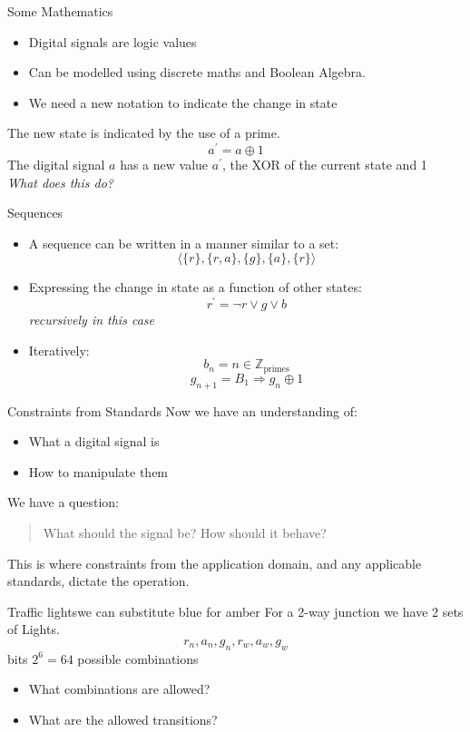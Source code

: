 \documentclass[xcolor=svgnames]{beamer}
\begin{document}
\begin{frame}{Some Mathematics}
\begin{itemize}
  \item Digital signals are logic values
  \item Can be modelled using discrete maths and Boolean Algebra.
  \item We need a new notation to indicate the change in state
\end{itemize}

\begin{definition}
  The new state is indicated by the use of a prime.
  \[
    a^\prime = a \oplus 1
  \]
The digital signal $a$ has a new value $a^\prime$,  the XOR of the current state and 1
\\[1em]
\hfill \textit{What does this do?}
\end{definition}
\end{frame}

\begin{frame}{Sequences}
  \begin{itemize}[<+->]
    \item A sequence can be written in a manner similar to a set:
    \[ \langle \{r\}, \{r,a\}, \{g\}, \{a\}, \{r\} \rangle \]
    \item Expressing the change in state as a function of other states:
    \[ r^\prime = \neg r \vee g \vee b \]
    \emph{ recursively in this case}
    \item Iteratively:
    \[ b_{n} = n \in \mathbb{Z}_\mathrm{primes} \]
    \[ g_{n+1} = B_1 \Rightarrow g_{n} \oplus 1 \]
  \end{itemize}

\end{frame}

\begin{frame}{Constraints from Standards}
Now we have an understanding of:
\begin{itemize}
  \item What a digital signal is
  \item How to manipulate them
\end{itemize}
We have a question:
\begin{quote}
What should the signal be?  How should it behave?
\end{quote}
This is where constraints from the application domain,
 and any applicable standards, dictate the operation.
\end{frame}

\begin{frame}{Traffic lights}{we can substitute blue for amber}
  For a 2-way junction we have 2 sets of Lights.
  \[ r_n, a_n, g_n, r_w, a_w, g_w \] bits $2^6 = 64$ possible combinations\pause
  \begin{itemize}[<+->]
    \item What combinations are allowed?
    \item What are the allowed transitions?
  \end{itemize}
\end{frame}
\end{document}
